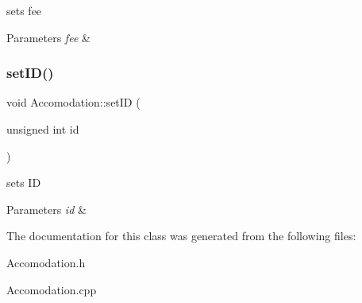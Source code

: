 sets fee 


\begin{DoxyParams}{Parameters}
{\em fee} & \\
\hline
\end{DoxyParams}
\hypertarget{class_accomodation_a3d06b872d484b5aa2455d65d98b63645}{}\label{class_accomodation_a3d06b872d484b5aa2455d65d98b63645} 
\subsubsection{\texorpdfstring{set\+I\+D()}{setID()}}
{\footnotesize\ttfamily void Accomodation\+::set\+ID (\begin{DoxyParamCaption}\item[{unsigned int}]{id }\end{DoxyParamCaption})\hspace{0.3cm}{\ttfamily [inline]}}



sets ID 


\begin{DoxyParams}{Parameters}
{\em id} & \\
\hline
\end{DoxyParams}


The documentation for this class was generated from the following files\+:\begin{DoxyCompactItemize}
\item 
Accomodation.\+h\item 
Accomodation.\+cpp\end{DoxyCompactItemize}
